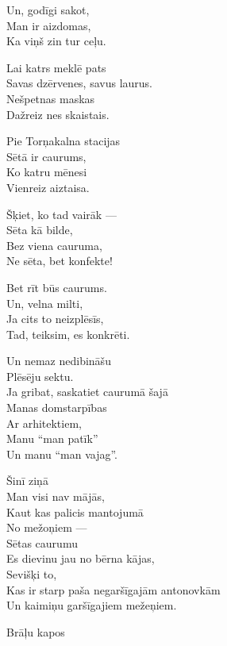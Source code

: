 \documentclass[14pt]{extarticle}
\begin{document}
Un, godīgi sakot,\\
Man ir aizdomas,\\
Ka viņš zin tur ceļu.

Lai katrs meklē pats\\
Savas dzērvenes, savus laurus.\\
Nešpetnas maskas\\
Dažreiz nes skaistais.

Pie Torņakalna stacijas\\
Sētā ir caurums,\\
Ko katru mēnesi\\
Vienreiz aiztaisa.

Šķiet, ko tad vairāk ---\\
Sēta kā bilde,\\
Bez viena cauruma,\\
Ne sēta, bet konfekte!

Bet rīt būs caurums.\\
Un, velna milti,\\
Ja cits to neizplēsīs,\\
Tad, teiksim, es konkrēti.

Un nemaz nedibināšu\\
Plēsēju sektu.\\
Ja gribat, saskatiet caurumā šajā\\
Manas domstarpības\\
Ar arhitektiem,\\
Manu ``man patīk''\\
Un manu ``man vajag''.

Šinī ziņā\\
Man visi nav mājās,\\
Kaut kas palicis mantojumā\\
No mežoņiem ---\\
Sētas caurumu\\
Es dievinu jau no bērna kājas,\\
Sevišķi to,\\
Kas ir starp paša negaršīgajām antonovkām\\
Un kaimiņu garšīgajiem mežeņiem.


\newpage

{\large \sc Brāļu kapos}
\end{document}
